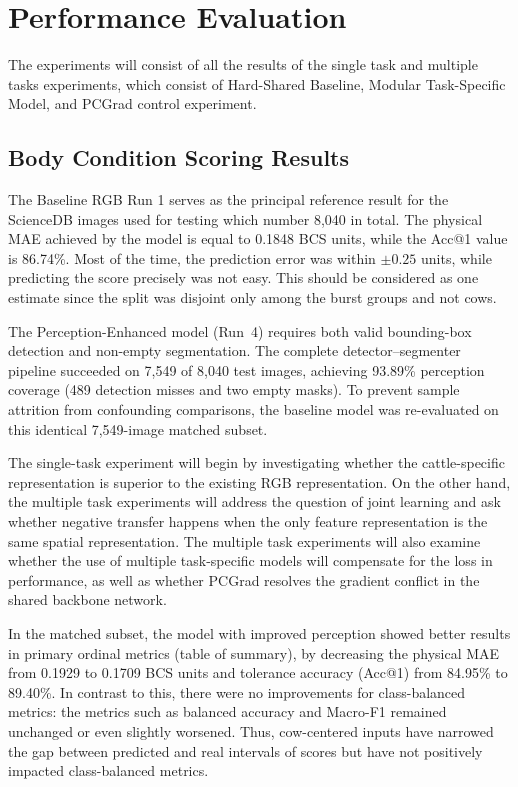 \section{Performance Evaluation}

The experiments will consist of all the results of the single task and multiple tasks experiments, which consist of Hard-Shared Baseline, Modular Task-Specific Model, and PCGrad control experiment.

\subsection{Body Condition Scoring Results}

The Baseline RGB Run 1 serves as the principal reference result for the ScienceDB images used for testing which number 8,040 in total. The physical MAE achieved by the model is equal to 0.1848 BCS units, while the Acc@1 value is 86.74\%. Most of the time, the prediction error was within $\pm0.25$ units, while predicting the score precisely was not easy. This should be considered as one estimate since the split was disjoint only among the burst groups and not cows.

The Perception-Enhanced model (Run~4) requires both valid bounding-box detection and non-empty segmentation. The complete detector--segmenter pipeline succeeded on 7,549 of 8,040 test images, achieving 93.89\% perception coverage (489 detection misses and two empty masks). To prevent sample attrition from confounding comparisons, the baseline model was re-evaluated on this identical 7,549-image matched subset.



The single-task experiment will begin by investigating whether the cattle-specific representation is superior to the existing RGB representation. On the other hand, the multiple task experiments will address the question of joint learning and ask whether negative transfer happens when the only feature representation is the same spatial representation. The multiple task experiments will also examine whether the use of multiple task-specific models will compensate for the loss in performance, as well as whether PCGrad resolves the gradient conflict in the shared backbone network.

In the matched subset, the model with improved perception showed better results in primary ordinal metrics (table of summary), by decreasing the physical MAE from 0.1929 to 0.1709 BCS units and tolerance accuracy (Acc@1) from 84.95\% to 89.40\%. In contrast to this, there were no improvements for class-balanced metrics: the metrics such as balanced accuracy and Macro-F1 remained unchanged or even slightly worsened. Thus, cow-centered inputs have narrowed the gap between predicted and real intervals of scores but have not positively impacted class-balanced metrics.

